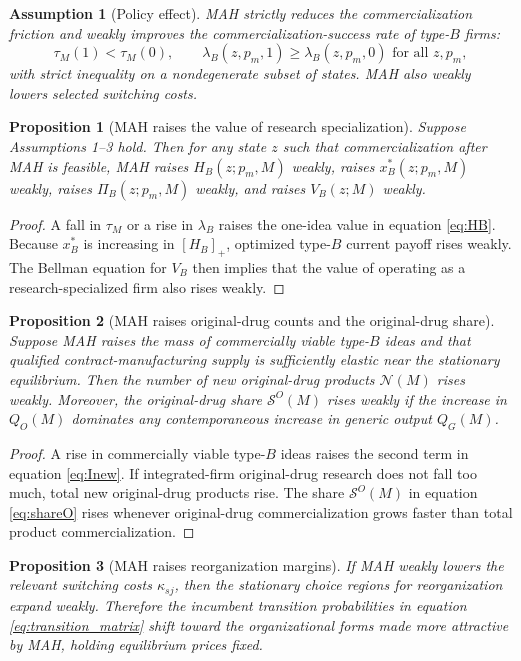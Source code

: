 \documentclass[12pt]{article}
\newtheorem{assumption}{Assumption}
\newtheorem{proposition}{Proposition}
\newcommand{\1}{\mathbf{1}}
\newcommand{\Inew}{\mathcal{N}}
\newcommand{\ShareO}{\mathcal{S}^O}
\begin{document}
\begin{assumption}[Policy effect]
MAH strictly reduces the commercialization friction and weakly improves the commercialization-success rate of type-$B$ firms:
\[
\tau_M(1)<\tau_M(0),
\qquad
\lambda_B(z,p_m,1)\ge \lambda_B(z,p_m,0)
\text{ for all } z,p_m,
\]
with strict inequality on a nondegenerate subset of states. MAH also weakly lowers selected switching costs.
\end{assumption}

\begin{proposition}[MAH raises the value of research specialization]
Suppose Assumptions 1--3 hold. Then for any state $z$ such that commercialization after MAH is feasible, MAH raises $H_B(z;p_m,M)$ weakly, raises $x_B^*(z;p_m,M)$ weakly, raises $\Pi_B(z;p_m,M)$ weakly, and raises $V_B(z;M)$ weakly.
\end{proposition}

\begin{proof}
A fall in $\tau_M$ or a rise in $\lambda_B$ raises the one-idea value in equation \eqref{eq:HB}. Because $x_B^*$ is increasing in $[H_B]_+$, optimized type-$B$ current payoff rises weakly. The Bellman equation for $V_B$ then implies that the value of operating as a research-specialized firm also rises weakly.
\end{proof}

\begin{proposition}[MAH raises original-drug counts and the original-drug share]
Suppose MAH raises the mass of commercially viable type-$B$ ideas and that qualified contract-manufacturing supply is sufficiently elastic near the stationary equilibrium. Then the number of new original-drug products $\Inew(M)$ rises weakly. Moreover, the original-drug share $\ShareO(M)$ rises weakly if the increase in $Q_O(M)$ dominates any contemporaneous increase in generic output $Q_G(M)$.
\end{proposition}

\begin{proof}
A rise in commercially viable type-$B$ ideas raises the second term in equation \eqref{eq:Inew}. If integrated-firm original-drug research does not fall too much, total new original-drug products rise. The share $\ShareO(M)$ in equation \eqref{eq:shareO} rises whenever original-drug commercialization grows faster than total product commercialization.
\end{proof}

\begin{proposition}[MAH raises reorganization margins]
If MAH weakly lowers the relevant switching costs $\kappa_{sj}$, then the stationary choice regions for reorganization expand weakly. Therefore the incumbent transition probabilities in equation \eqref{eq:transition_matrix} shift toward the organizational forms made more attractive by MAH, holding equilibrium prices fixed.
\end{proposition}
\end{document}
